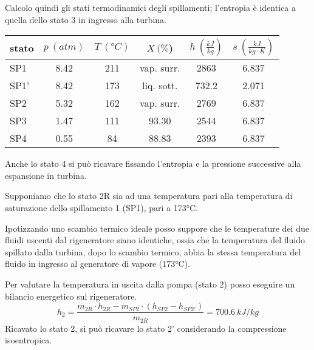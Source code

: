 Calcolo quindi gli stati termodinamici degli spillamenti; l'entropia è identica a quella dello stato 3 in ingresso alla turbina.
\begin{center}
    \begin{tabular}{l|c|c|c|c|c}
        stato    & $p\ (atm)$ & $T\ (\text{°}C) $&$X\ (\%$)& $h\ (\frac{kJ}{kg})$  & $s\ (\frac{kJ}{kg\cdot K})$\\ \hline
        SP1   &       8.42 &     211     & vap. surr. &  2863   &6.837 \\ \hline 
        SP1'    &       8.42    &173    &   liq. sott. &732.2   &2.071  \\ \hline
        SP2  &        5.32    &    162    & vap. surr. & 2769  &6.837 \\ \hline    
        SP3  &      1.47       &    111    &  93.30    &2544 &6.837   \\ \hline
        SP4   &    0.55      &      84    &    88.83   & 2393&6.837 
    \end{tabular}
\end{center}

Anche lo stato 4 si può ricavare fissando l'entropia e la pressione successive alla espansione in turbina.

Supponiamo che lo stato 2R sia ad una temperatura pari alla temperatura di saturazione dello spillamento 1 (SP1), pari a 173°C.

Ipotizzando uno scambio termico ideale posso suppore che le temperature dei due fluidi uscenti dal rigeneratore siano identiche, ossia che la temperatura
del fluido spillato dalla turbina, dopo lo scambio termico, abbia la stessa temperatura del fluido in ingresso al generatore di vapore (173°C).

Per valutare la temperatura in uscita dalla pompa (stato 2) posso eseguire un bilancio energetico sul rigeneratore.
\begin{equation*}
    h_2 =\frac{ \dot m_{2R}\cdot h_{2R} - \dot m_{SP2}\cdot(h_{SP2}-h_{SP2'})}{\dot m_{2R}} = 700.6\ kJ/kg
\end{equation*}
Ricavato lo stato 2, si può ricavare lo stato 2' considerando la compressione isoentropica.

